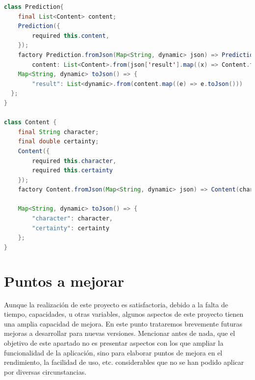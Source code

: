 \documentclass{article}
\begin{document}
\noindent\begin{minipage}{\textwidth}
\begin{lstlisting}[language=java]
class Prediction{
	final List<Content> content;
	Prediction({
    	required this.content,
	});
	factory Prediction.fromJson(Map<String, dynamic> json) => Prediction(
    	content: List<Content>.from(json['result'].map((x) => Content.fromJson(x))));
	Map<String, dynamic> toJson() => {
    	"result": List<dynamic>.from(content.map((e) => e.toJson()))
  };
}

class Content {
	final String character;
	final double certainty;
	Content({
    	required this.character,
    	required this.certainty
	});
	factory Content.fromJson(Map<String, dynamic> json) => Content(character: json['character'], certainty: json['confidence']);
 
	Map<String, dynamic> toJson() => {
    	"character": character,
    	"certainty": certainty
	};
}
\end{lstlisting}
\end{minipage}




\newpage

\section{Puntos a mejorar}
\label{sec:Improvements}

Aunque la realización de este proyecto es satisfactoria, debido a la falta de tiempo, capacidades, u otras variables, algunos aspectos de este proyecto tienen una amplia capacidad de mejora. En este punto trataremos brevemente futuras mejoras a desarrollar para nuevas versiones. Mencionar antes de nada, que el objetivo de este apartado no es presentar aspectos con los que ampliar la funcionalidad de la aplicación, sino para elaborar puntos de mejora en el rendimiento, la facilidad de uso, etc. considerables que no se han podido aplicar por diversas circunstancias.
\end{document}
